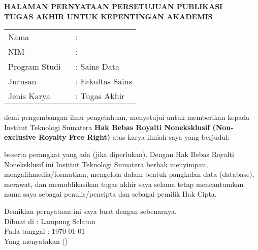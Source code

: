 \clearpage
{}%

\begin{center}
	\smallskip
	
	\normalsize \bfseries \MakeUppercase{
		HALAMAN PERNYATAAN PERSETUJUAN PUBLIKASI \\
		TUGAS AKHIR UNTUK KEPENTINGAN AKADEMIS
	}\linebreak
	
	\normalsize \normalfont \onehalfspacing {}
	
	\flushleft
	\setlength{\tabcolsep}{0pt}
	\begin{tabular}{l l}
		Nama 			&  : \theauthor\\
		NIM 			&  : \printnim\\
		Program Studi \	&  : Sains Data\\
		Jurusan 		&  : Fakultas Sains\\
		Jenis Karya 	&  : Tugas Akhir\\
	\end{tabular}

	\justifying
	demi pengembangan ilmu pengetahuan, menyetujui untuk memberikan kepada Institut Teknologi Sumatera \textbf{Hak Bebas Royalti Noneksklusif (Non-exclusive Royalty Free Right)} atas karya ilmiah saya yang berjudul: 
	
	\centering
	\textbf{\thetitle}
	
	\justifying
	beserta perangkat yang ada (jika diperlukan). Dengan Hak Bebas Royalti Noneksklusif ini Institut Teknologi Sumatera berhak menyimpan, mengalihmedia/formatkan, mengelola dalam bentuk pangkalan data (database), merawat, dan memublikasikan tugas akhir saya selama tetap mencantumkan nama saya sebagai penulis/pencipta dan sebagai pemilik Hak Cipta.
	
	Demikian pernyataan ini saya buat dengan sebenarnya. \\
	
	\centering
	Dibuat di : Lampung Selatan\\
	Pada tanggal : \today{}\\ %
	\vspace{3cm}
	Yang menyatakan (\theauthor)
	
	
\end{center}
\clearpage
